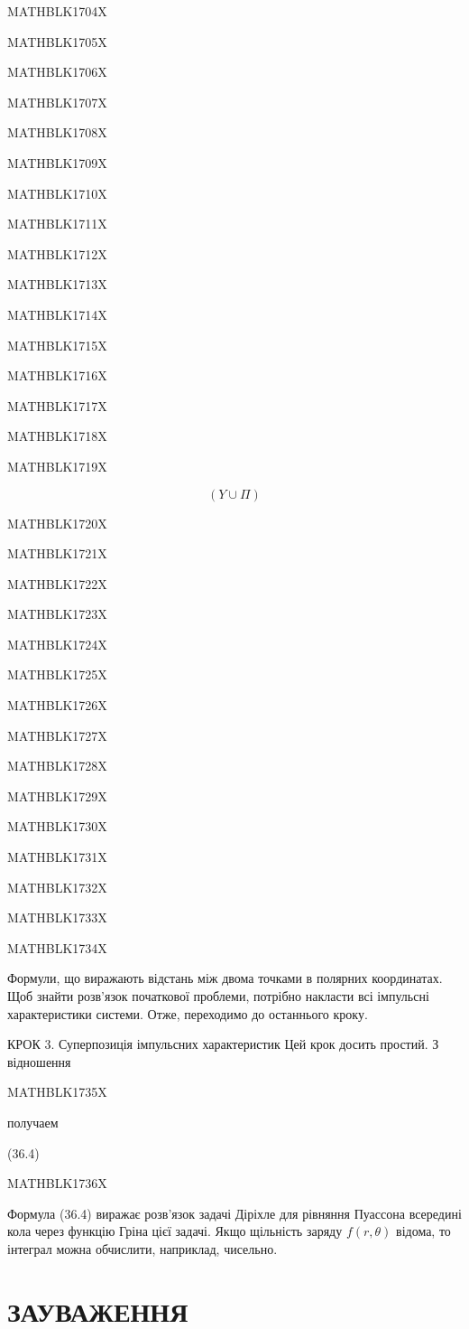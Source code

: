 \documentclass[
  ukrainian,
]{article}
\begin{document}
MATHBLK1704X

MATHBLK1705X

MATHBLK1706X

MATHBLK1707X

MATHBLK1708X

MATHBLK1709X

MATHBLK1710X

MATHBLK1711X

MATHBLK1712X

MATHBLK1713X

MATHBLK1714X

MATHBLK1715X

MATHBLK1716X

MATHBLK1717X

MATHBLK1718X

MATHBLK1719X

\[
(Y \cup \Pi)
\]

MATHBLK1720X

MATHBLK1721X

MATHBLK1722X

MATHBLK1723X

MATHBLK1724X

MATHBLK1725X

MATHBLK1726X

MATHBLK1727X

MATHBLK1728X

MATHBLK1729X

MATHBLK1730X

MATHBLK1731X

MATHBLK1732X

MATHBLK1733X

MATHBLK1734X

Формули, що виражають відстань між двома точками в полярних координатах.
Щоб знайти розв'язок початкової проблеми, потрібно накласти всі
імпульсні характеристики системи. Отже, переходимо до останнього кроку.

КРОК 3. Суперпозиція імпульсних характеристик Цей крок досить простий. З
відношення

MATHBLK1735X

получаем

(36.4)

MATHBLK1736X

Формула (36.4) виражає розв'язок задачі Діріхле для рівняння Пуассона
всередині кола через функцію Гріна цієї задачі. Якщо щільність заряду
\(f(r, \theta)\) відома, то інтеграл можна обчислити, наприклад,
чисельно.

\section{ЗАУВАЖЕННЯ}\label{ux437ux430ux443ux432ux430ux436ux435ux43dux43dux44f}
\end{document}
